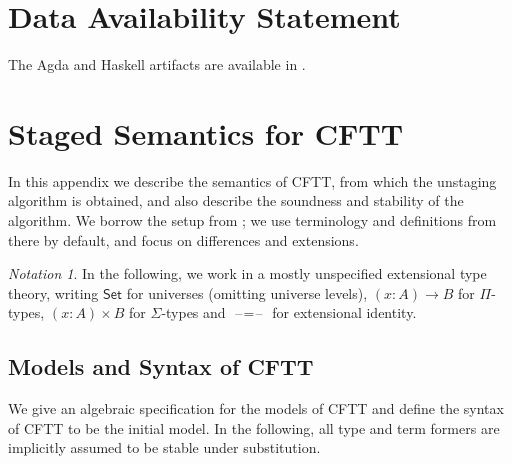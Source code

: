 \documentclass[acmsmall]{acmart}
\newcommand{\msf}[1]{{\mathsf{#1}}}
\newcommand{\Set}{\msf{Set}}
\newcommand{\blank}{{\mathord{\hspace{1pt}\text{--}\hspace{1pt}}}}
\theoremstyle{remark}
\newtheorem{notation}{Notation}
\begin{document}
\section*{Data Availability Statement}
The Agda and Haskell artifacts are available in \cite{cftt-artifacts}.




\appendices
\section{Staged Semantics for CFTT}\label{appendix:A}

In this appendix we describe the semantics of CFTT, from which the unstaging
algorithm is obtained, and also describe the soundness and stability of the
algorithm. We borrow the setup from \cite{staged2ltt}; we use terminology and
definitions from there by default, and focus on differences and extensions.

\begin{notation} In the following, we work in a mostly unspecified extensional
type theory, writing $\Set$ for universes (omitting universe levels), $(x : A) \to B$
for $\Pi$-types, $(x : A) \times B$ for $\Sigma$-types and $\blank\!=\!\blank$ for
extensional identity.

\end{notation}

\subsection{Models and Syntax of CFTT}

We give an algebraic \cite{cartmellthesis,DBLP:journals/corr/abs-2302-08837}
specification for the models of CFTT and define the syntax of CFTT to be the
initial model. In the following, all type and term formers are implicitly
assumed to be stable under substitution.
\end{document}
